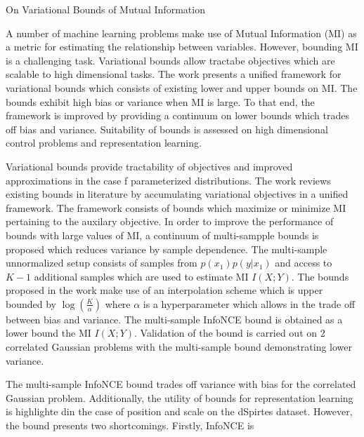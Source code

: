 \documentclass[11pt,letterpaper]{article}
\begin{document}
\begin{center}
  \large{On Variational Bounds of Mutual Information}
\end{center}



A number of machine learning problems make use of Mutual Information (MI) as a metric for estimating the relationship between variables. However, bounding MI is a challenging task. Variational bounds allow tractabe objectives which are scalable to high dimensional tasks. The work presents a unified framework for variational bounds which consists of existing lower and upper bounds on MI. The bounds exhibit high bias or variance when MI is large. To that end, the framework is improved by providing a continuum on lower bounds which trades off bias and variance. Suitability of bounds is assessed on high dimensional control problems and representation learning. 

Variational bounds provide tractability of objectives and improved approximations in the case f parameterized distributions. The work reviews existing bounds in literature by accumulating variational objectives in a unified framework. The framework consists of bounds which maximize or minimize MI pertaining to the auxilary objective. In order to improve the performance of bounds with large values of MI, a continuum of multi-sampple bounds is proposed which reduces variance by sample dependence. The multi-sample unnormalized setup consists of samples from $p(x_{1})p(y|x_{1})$ and access to $K-1$ additional samples which are used to estimate MI $I(X;Y)$. The bounds proposed in the work make use of an interpolation scheme which is upper bounded by $\log(\frac{K}{\alpha})$ where $\alpha$ is a hyperparameter which allows in the trade off between bias and variance. The multi-sample InfoNCE bound is obtained as a lower bound the MI $I(X;Y)$. Validation of the bound is carried out on 2 correlated Gaussian problems with the multi-sample bound demonstrating lower variance.

The multi-sample InfoNCE bound trades off variance with bias for the correlated Gaussian problem. Additionally, the utility of bounds for representation learning is highlighte din the case of position and scale on the dSpirtes dataset. However, the bound presents two shortcomings. Firstly, InfoNCE is 
\end{document}
